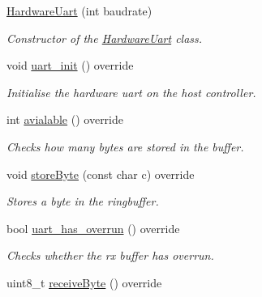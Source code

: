 \begin{DoxyCompactItemize}
\item 
\hyperlink{classHardwareUart_aa5ca3cbeac085c36f9902a6933009615}{Hardware\+Uart} (int baudrate)
\begin{DoxyCompactList}\small\item\em Constructor of the \hyperlink{classHardwareUart}{Hardware\+Uart} class. \end{DoxyCompactList}\item 
\mbox{\label{classHardwareUart_a2425939b2fc43a8ff119687cf878fa05}} 
void \hyperlink{classHardwareUart_a2425939b2fc43a8ff119687cf878fa05}{uart\+\_\+init} () override
\begin{DoxyCompactList}\small\item\em Initialise the hardware uart on the host controller. \end{DoxyCompactList}\item 
\mbox{\label{classHardwareUart_a01095dd408b5cf2cd81326887d6dd6cd}} 
int \hyperlink{classHardwareUart_a01095dd408b5cf2cd81326887d6dd6cd}{avialable} () override
\begin{DoxyCompactList}\small\item\em Checks how many bytes are stored in the buffer. \end{DoxyCompactList}\item 
\mbox{\label{classHardwareUart_aaa0022de2385260ae43663e813934c4f}} 
void \hyperlink{classHardwareUart_aaa0022de2385260ae43663e813934c4f}{store\+Byte} (const char c) override
\begin{DoxyCompactList}\small\item\em Stores a byte in the ringbuffer. \end{DoxyCompactList}\item 
bool \hyperlink{classHardwareUart_a0cfa72622aa1bd0a2e97a56452f0c552}{uart\+\_\+has\+\_\+overrun} () override
\begin{DoxyCompactList}\small\item\em Checks whether the rx buffer has overrun. \end{DoxyCompactList}\item 
\mbox{\label{classHardwareUart_ac8adb0c6e412026e0e95a7a940fbe1a9}} 
uint8\+\_\+t \hyperlink{classHardwareUart_ac8adb0c6e412026e0e95a7a940fbe1a9}{receive\+Byte} () override

\end{DoxyCompactItemize}

